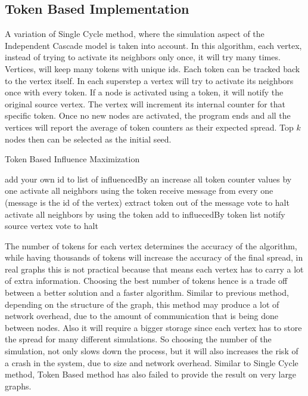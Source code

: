 \documentclass[english]{tktltiki}
\begin{document}
\subsection{Token Based Implementation}
A variation of Single Cycle method, where the simulation aspect of the Independent Cascade model is taken into account. In this algorithm, each vertex, instead of trying to activate its neighbors only once, it will try many times. Vertices, will keep many tokens with unique ids. Each token can be tracked back to the vertex itself. In each superstep a vertex will try to activate its neighbors once with every token. If a node is activated using a token, it will notify the original source vertex. The vertex will increment its internal counter for that specific token. Once no new nodes are activated, the program ends and all the vertices will report the average of token counters as their expected spread. Top $k$ nodes then can be selected as the initial seed.
\begin{algorithm}[ht!]
\caption{Token Based Influence Maximization}
\begin{algorithmic}
	\State add your own id to list of influencedBy an increase all token counter values by one
		\State activate all neighbors using the token
	\EndFor
\Else
	\State receive message from every one (message is the id of the vertex)
		\State extract token out of the message
			\State vote to halt
		\Else
			\State activate all neighbors by using the token
			\State add to influecedBy token list 
			\State notify source vertex
			\State vote to halt
		\EndIf
		
	\EndFor
\EndIf
\end{algorithmic}
\end{algorithm}
The number of tokens for each vertex determines the accuracy of the algorithm, while having thousands of tokens will increase the accuracy of the final spread, in real graphs this is not practical because that means each vertex has to carry a lot of extra information. Choosing the best number of tokens hence is a trade off between a better solution and a faster algorithm. Similar to previous method, depending on the structure of the graph, this method may produce a lot of network overhead, due to the amount of communication that is being done between nodes. Also it will require a bigger storage since each vertex has to store the spread for many different simulations. So choosing the number of the simulation, not only slows down the process, but it will also increases the risk of a crash in the system, due to size and network overhead. Similar to Single Cycle method, Token Based method has also failed to provide the result on very large graphs.
\end{document}

